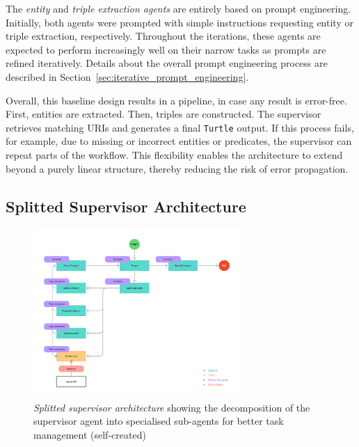 \documentclass[a4paper,oneside,bibliography=totoc]{scrbook}
\begin{document}
The \textit{entity} and \textit{triple extraction agents} are entirely based on prompt engineering. Initially, both agents were prompted with simple instructions requesting entity or triple extraction, respectively. Throughout the iterations, these agents are expected to perform increasingly well on their narrow tasks as prompts are refined iteratively. Details about the overall prompt engineering process are described in Section~\ref{sec:iterative_prompt_engineering}.

Overall, this baseline design results in a pipeline, in case any result is error-free. First, entities are extracted. Then, triples are constructed. The supervisor retrieves matching \acp{URI} and generates a final \texttt{Turtle} output. If this process fails, for example, due to missing or incorrect entities or predicates, the supervisor can repeat parts of the workflow. This flexibility enables the architecture to extend beyond a purely linear structure, thereby reducing the risk of error propagation.

\subsection{Splitted Supervisor Architecture}
\label{subsec:supervisor}

\begin{figure}[tp]
  \centering
  \includegraphics[width=0.7\textwidth]{figures/Splitted Supervisor Architecture.png}
  \caption[\textit{Splitted supervisor architecture} showing the decomposition of the supervisor agent into specialised sub-agents for better task management]{\textit{Splitted supervisor architecture} showing the decomposition of the supervisor agent into specialised sub-agents for better task management (self-created)}
  \label{fig:splitted_supervisor_architecture}
\end{figure}
\end{document}
